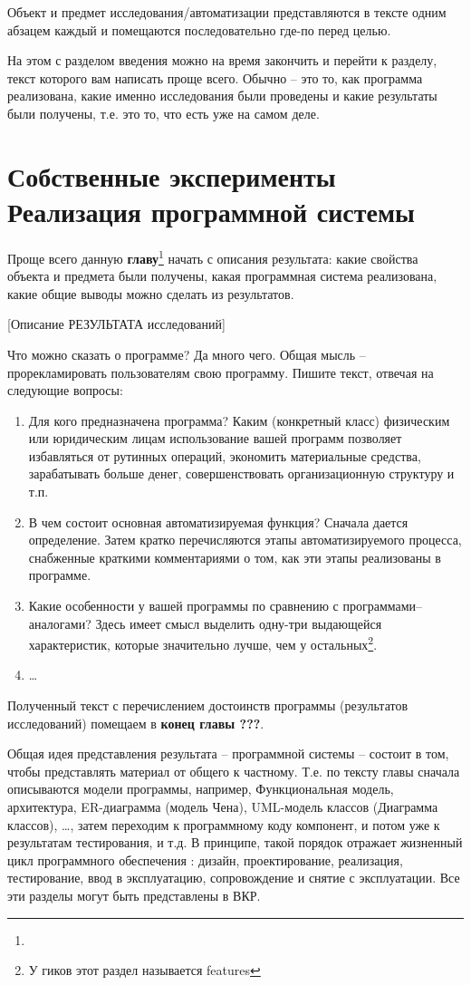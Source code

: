 \documentclass[a4paper,14pt,final]{extreport}
\begin{document}
Объект и предмет исследования/автоматизации представляются в тексте одним абзацем каждый и помещаются последовательно где-по перед целью.

На этом с разделом введения можно на время закончить и перейти к разделу, текст которого вам написать проще всего.  Обычно -- это то, как программа реализована, какие именно исследования были проведены и какие результаты были получены, т.е. это то, что есть уже на самом деле.

\section{Собственные эксперименты\\Реализация программной системы}

Проще всего данную \textbf{главу}\footnote{} начать с описания результата: какие свойства объекта и предмета были получены, какая программная система реализована, какие общие выводы можно сделать из результатов.

[Описание РЕЗУЛЬТАТА исследований]

Что можно сказать о программе?  Да много чего.  Общая мысль -- прорекламировать пользователям свою программу.  Пишите текст, отвечая на следующие вопросы:
\begin{enumerate}
\item Для кого предназначена программа?  Каким (конкретный класс) физическим или юридическим лицам использование вашей программ позволяет избавляться от рутинных операций, экономить материальные средства, зарабатывать больше денег, совершенствовать организационную структуру и т.п.
\item В чем состоит основная автоматизируемая функция?  Сначала дается определение.  Затем кратко перечисляются этапы автоматизируемого процесса, снабженные краткими комментариями о том, как эти этапы реализованы в программе.
\item Какие особенности у вашей программы по сравнению с программами--аналогами?  Здесь имеет смысл выделить одну-три выдающейся характеристик, которые значительно лучше, чем у остальных\footnote{У гиков этот раздел называется features}.
\item \ldots
\end{enumerate}

Полученный текст с перечислением достоинств программы (результатов исследований) помещаем в \textbf{конец главы ???}.

Общая идея представления результата -- программной системы -- состоит в том, чтобы представлять материал от общего к частному.  Т.е. по тексту главы сначала описываются модели программы, например, Функциональная модель, архитектура, ER-диаграмма (модель Чена), UML-модель классов (Диаграмма классов), \ldots{}, затем переходим к программному коду компонент, и потом уже к результатам тестирования, и т.д.  В принципе, такой порядок отражает жизненный цикл программного обеспечения \cite{ZHC}: дизайн, проектирование, реализация, тестирование, ввод в эксплуатацию, сопровождение и снятие с эксплуатации.  Все эти разделы могут быть представлены в ВКР.
\end{document}
